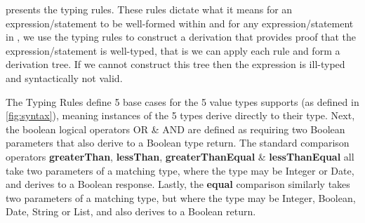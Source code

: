  presents the \thePolicyLang typing rules.
These rules dictate what it means for an expression/statement to be well-formed within \thePolicyLang and for any expression/statement in \thePolicyLang, we use the typing rules to construct a derivation that provides proof that the expression/statement is well-typed, that is we can apply each rule and form a derivation tree. If we cannot construct this tree then the expression is ill-typed and syntactically not valid.

The Typing Rules define 5 base cases for the 5 value types \thePolicyLang supports (as defined in \cref{fig:syntax}), meaning instances of the 5 types derive directly to their type. Next, the boolean logical operators OR \& AND are defined as requiring two Boolean parameters that also derive to a Boolean type return. The standard comparison operators \textbf{greaterThan}, \textbf{lessThan}, \textbf{greaterThanEqual} \& \textbf{lessThanEqual} all take two parameters of a matching type, where the type may be Integer or Date, and derives to a Boolean response. Lastly, the \textbf{equal} comparison similarly takes two parameters of a matching type, but where the type may be Integer, Boolean, Date, String or List, and also derives to a Boolean return.
